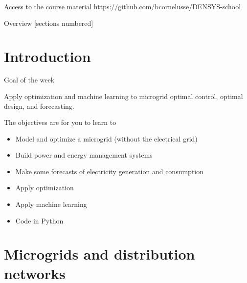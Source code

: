 \titleframe

\begin{frame}{Access to the course material}
    \centering
    \alert{\url{https://github.com/bcornelusse/DENSYS-school}}\\[2mm]
\end{frame}


\begin{frame}{Overview}
  [sections numbered]
  \tableofcontents[hideallsubsections]
\end{frame}


\section{Introduction}
\begin{frame}{Goal of the week}
\centering 
\begin{minipage}{0.7\textwidth}
\large Apply optimization and machine learning to microgrid optimal control, optimal design, and forecasting.
\end{minipage}
\end{frame}

\begin{frame}{The objectives are for you to learn to}
\begin{itemize}
    \item Model and optimize a microgrid (without the electrical grid) 
    \item Build power and energy management systems
    \item Make some forecasts of electricity generation and consumption
    \item Apply optimization
    \item Apply machine learning
    \item Code in Python
\end{itemize}
\end{frame}


\section{Microgrids and distribution networks}


